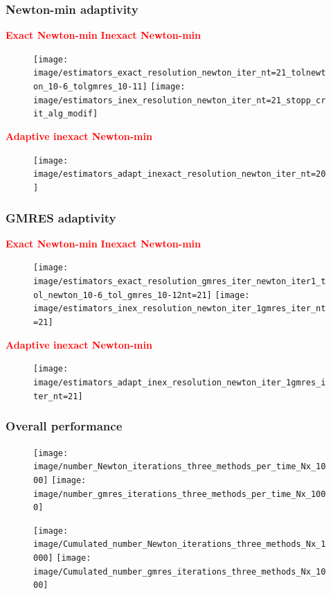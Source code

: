 \documentclass[10 pt]{beamer}
\begin{document}
\begin{frame}
\frametitle{Newton-min adaptivity}
\vspace{-0.1 cm}
\hspace{2 cm} \scriptsize{\textcolor{red}{\textbf{Exact Newton-min}}} \hspace{4.5 cm} \scriptsize{\textcolor{red}{\textbf{Inexact Newton-min}}}
\vspace{-0.1 cm}
\begin{figure}
\texttt{[image: image/estimators\_exact\_resolution\_newton\_iter\_nt=21\_tolnewton\_10-6\_tolgmres\_10-11]}
\qquad \qquad \qquad \texttt{[image: image/estimators\_inex\_resolution\_newton\_iter\_nt=21\_stopp\_crit\_alg\_modif]}
\end{figure}
\hspace{4.8 cm}\scriptsize{\textcolor{red}{\textbf{Adaptive inexact Newton-min}}}
\vspace{-0.15 cm}\begin{figure}
\texttt{[image: image/estimators\_adapt\_inexact\_resolution\_newton\_iter\_nt=20]}
\end{figure}
\end{frame}
%
\begin{frame}
\frametitle{GMRES adaptivity}
\hspace{2 cm}\scriptsize{\textcolor{red}{\textbf{Exact Newton-min}}} \hspace{4.8 cm}\scriptsize{\textcolor{red}{\textbf{Inexact Newton-min}}}
\vspace{-0.1 cm}
\begin{figure}
\texttt{[image: image/estimators\_exact\_resolution\_gmres\_iter\_newton\_iter1\_tol\_newton\_10-6\_tol\_gmres\_10-12nt=21]} \qquad \qquad \qquad \qquad
\texttt{[image: image/estimators\_inex\_resolution\_newton\_iter\_1gmres\_iter\_nt=21]}
\end{figure}
\vspace{-0.2 cm}
\hspace{5 cm}\scriptsize{\textcolor{red}{\textbf{Adaptive inexact Newton-min}}}
\vspace{-0.2 cm}
\begin{figure}
\texttt{[image: image/estimators\_adapt\_inex\_resolution\_newton\_iter\_1gmres\_iter\_nt=21]}
\end{figure}
\end{frame}
\begin{frame}
\frametitle{Overall performance}
\vspace{-0.2 cm}
\begin{figure}
\centering
\texttt{[image: image/number\_Newton\_iterations\_three\_methods\_per\_time\_Nx\_1000]}
\hspace{1 cm}
\texttt{[image: image/number\_gmres\_iterations\_three\_methods\_per\_time\_Nx\_1000]}
\end{figure}
\vspace{-0.3 cm}
\begin{figure}
\centering
\texttt{[image: image/Cumulated\_number\_Newton\_iterations\_three\_methods\_Nx\_1000]}
\hspace{1 cm}
\texttt{[image: image/Cumulated\_number\_gmres\_iterations\_three\_methods\_Nx\_1000]}
\end{figure}
\end{frame}
\end{document}
